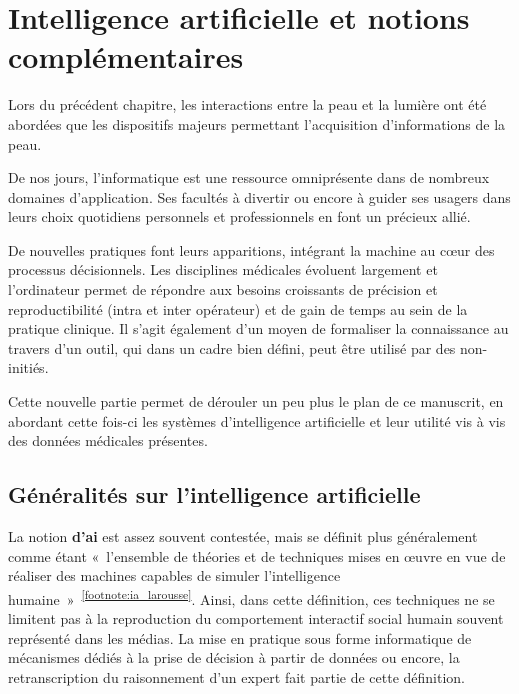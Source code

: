 \chapter{Intelligence artificielle et notions complémentaires}
\label{chap:chapter_3}
\chapterintro
Lors du précédent chapitre, les interactions entre la peau et la lumière ont été abordées que les dispositifs majeurs permettant l'acquisition d'informations de la peau.\par

De nos jours, l’informatique est une ressource omniprésente dans de nombreux domaines d’application. Ses facultés à divertir ou encore à guider ses usagers dans leurs choix quotidiens personnels et professionnels en font un précieux allié.\par 

De nouvelles pratiques font leurs apparitions, intégrant la machine au cœur des processus décisionnels. Les disciplines médicales évoluent largement et l’ordinateur permet de répondre aux besoins croissants de précision et reproductibilité (intra et inter opérateur) et de gain de temps au sein de la pratique clinique. Il s’agit également d’un moyen de formaliser la connaissance au travers d’un outil, qui dans un cadre bien défini, peut être utilisé par des non-initiés.\par

Cette nouvelle partie permet de dérouler un peu plus le plan de ce manuscrit, en abordant cette fois-ci les systèmes d'intelligence artificielle et leur utilité vis à vis des données médicales présentes.\par
\newpage

\section{Généralités sur l'intelligence artificielle}
\label{sec:artificial_intelligence}
La notion \textbf{d’\gls{ai}} est assez souvent contestée, mais se définit plus généralement comme étant «~l’ensemble de théories et de techniques mises en œuvre en vue de réaliser des machines capables de simuler l'intelligence humaine~»~\textsuperscript{\ref{footnote:ia_larousse}}. Ainsi, dans cette définition, ces techniques ne se limitent pas à la reproduction du comportement interactif social humain souvent représenté dans les médias. La mise en pratique sous forme informatique de mécanismes dédiés à la prise de décision à partir de données ou encore, la retranscription du raisonnement d'un expert fait partie de cette définition.\par

